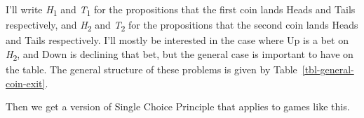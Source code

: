 \documentclass[
  12pt,
  letterpaper,
  DIV=11,
  numbers=noendperiod]{scrreprt}
\begin{document}
I'll write \emph{H}\textsubscript{1} and \emph{T}\textsubscript{1} for
the propositions that the first coin lands Heads and Tails respectively,
and \emph{H}\textsubscript{2} and \emph{T}\textsubscript{2} for the
propositions that the second coin lands Heads and Tails respectively.
I'll mostly be interested in the case where Up is a bet on
\emph{H}\textsubscript{2}, and Down is declining that bet, but the
general case is important to have on the table. The general structure of
these problems is given by Table~\ref{tbl-general-coin-exit}.

\begin{table}

\caption{\label{tbl-general-coin-exit}The abstract form of an exit
problem with coins.}

\begin{minipage}[t]{0.50\linewidth}



\end{minipage}%
%
\begin{minipage}[t]{0.50\linewidth}



\end{minipage}%

\end{table}%

Then we get a version of Single Choice Principle that applies to games
like this.
\end{document}
